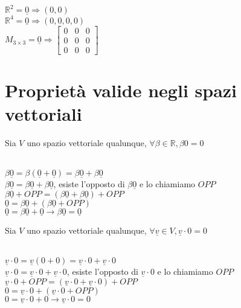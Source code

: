 \begin{es}
  \phantom{}\\
  $\mathbb{R}^2=\underline{0} \Rightarrow (0,0)$\\
  $\mathbb{R}^4=\underline{0} \Rightarrow (0,0,0,0)$\\
  $M_{3\times3}=\underline{0} \Rightarrow
  \begin{bmatrix}
    0 & 0 & 0 \\
    0 & 0 & 0 \\
    0 & 0 & 0
  \end{bmatrix}$
\end{es}

\section{Proprietà valide negli spazi vettoriali}

\begin{proposizione}
  Sia $V$ uno spazio vettoriale qualunque,
  $\forall\beta\in\mathbb{R}, \beta 0=0$\\
  \begin{dimostrazione}
    \phantom{}\\
    $\beta \underline{0}=\beta(\underline{0}+\underline{0})=\beta
    \underline{0}+\beta \underline{0}$\\
    $\beta \underline{0}=\beta \underline{0}+\beta \underline{0}$,
    esiste l'opposto di $\beta \underline{0}$ e lo chiamiamo $OPP$\\
    $\beta \underline{0}+ OPP=(\beta \underline{0}+\beta \underline{0})+OPP$\\
    $\underline{0}=\beta \underline{0}+(\beta \underline{0}+OPP)$\\
    $\underline{0}=\beta \underline{0}+\underline{0}\rightarrow \beta
    \underline{0}=\underline{0}$
  \end{dimostrazione}
\end{proposizione}

\begin{proposizione}
  Sia $V$ uno spazio vettoriale qualunque, $\forall \underline{v}\in
  V, \underline{v}\cdot0=0$\\
  \begin{dimostrazione}
    \phantom{}\\
    $\underline{v}\cdot0=\underline{v}(0+0)=\underline{v}\cdot0+\underline{v}\cdot0$\\
    $\underline{v}\cdot0=\underline{v}\cdot0+\underline{v}\cdot0$,
    esiste l'opposto di $\underline{v}\cdot0$ e lo chiamiamo $OPP$\\
    $\underline{v}\cdot0+ OPP=(\underline{v}\cdot0+\underline{v}\cdot0)+OPP$\\
    $0=\underline{v}\cdot0+(\underline{v}\cdot0+OPP)$\\
    $0=\underline{v}\cdot0+0\rightarrow \underline{v}\cdot0=0$
  \end{dimostrazione}
\end{proposizione}


